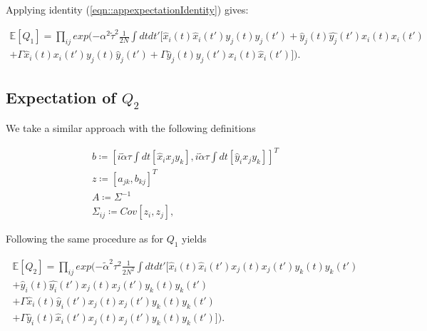 \documentclass[.../main.tex]{subfiles}
\begin{document}
	Applying identity (\ref{eqn::appexpectationIdentity}) gives:

	\begin{equation}
	\begin{split}
		\mathbb{E}[Q_1] = \prod_{ij} exp(- \alpha^2 \tilde{\tau}^2 \frac{1}{2N} \int dt dt'[
		\hat{x}_i
		(t) \hat{x}_i
		(t') y_j(t) y_j(t') + \hat{y}_j(t) \hat{y_j}(t') x_i(t) x_i(t') \\ + \Gamma \hat{x}_i(t) 
		{x}_i
		(t') {y}_j(t) \hat{y}_j(t') + \Gamma \hat{y}_j(t) {y}_j(t') {x}_i(t) \hat{x}_i(t')]).
	\end{split}
	\end{equation}


	\subsection{Expectation of $Q_2$} %
	\label{ssub:appexpectation_of_Q2}
	
	We take a similar approach with the following definitions

	\begin{equation*}
		\begin{split}
			b \coloneqq [i \tilde{\alpha} \tau \int dt[\hat{x}_i x_j y_k], i \tilde{\alpha} 
			\tau
			\int
			dt[\hat{y}_i x_j y_k]]^T \\
			z \coloneqq [a_{jk}, b_{kj}]^T\\
			A \coloneqq \Sigma^{-1}\\
			\Sigma_{ij} \coloneqq Cov[z_i, z_j],
		\end{split}
	\end{equation*}


	Following the same procedure as for $Q_1$ yields

	\begin{equation}
	\begin{split}
		\mathbb{E}[Q_2] = \prod_{ij} exp(- \tilde{\alpha}^2 \tau^2 \frac{1}{2N^2} \int dt dt'[
		\hat{x}_i
		(t) \hat{x}_i
		(t') x_j(t) x_j(t') y_k(t) y_k(t') \\+ \hat{y}_i(t) \hat{y_i}(t') x_j(t) x_j(t') y_k(t)
		y_k(t') \\ + \Gamma \hat{x}_i(t) \hat{y}_i(t')
		{x}_j
		(t) x_j{(t')} {y}_k(t) y_k(t') \\ + \Gamma \hat{y}_i(t) \hat{x}_i(t') {x}_j(t) {x}_j(t')
		y_k(t) y_k(t')]).
	\end{split}
	\end{equation}
\end{document}
